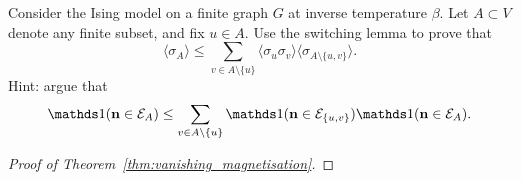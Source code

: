 \begin{exercise}[difficult]
    Consider the Ising model on a finite graph $G$ at inverse temperature $\beta$.
    Let $A\subset V$ denote any finite subset,
    and fix $u\in A$.
    Use the switching lemma to prove that
    \[
        \langle\sigma_A\rangle \leq
        \sum_{v\in A\setminus\{u\}}
        \langle\sigma_u\sigma_v\rangle
        \langle\sigma_{A\setminus\{u,v\}}\rangle.
    \]
    Hint: argue that
    \[
        \true{\n\in\calE_A}
        \leq
        \sum_{v\in A\setminus\{u\}}
        \true{\n\in\calE_{\{u,v\}}}
        \true{\n\in\calE_A}.
    \]
\end{exercise}


\begin{proof}[Proof of Theorem~\ref{thm:vanishing_magnetisation}]
    
\end{proof}


